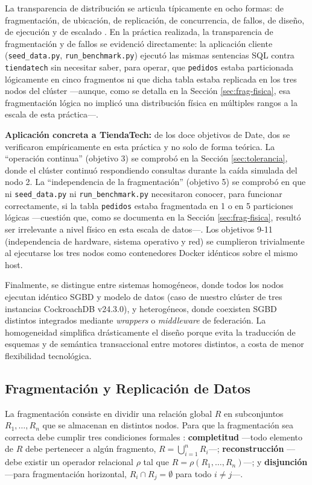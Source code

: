 \documentclass[10pt,letterpaper]{article}
\begin{document}
La transparencia de distribución se articula típicamente en ocho formas: de fragmentación, de ubicación, de replicación, de concurrencia, de fallos, de diseño, de ejecución y de escalado \citep{ozsu2020}. En la práctica realizada, la transparencia de fragmentación y de fallos se evidenció directamente: la aplicación cliente (\texttt{seed\_data.py}, \texttt{run\_benchmark.py}) ejecutó las mismas sentencias SQL contra \texttt{tiendatech} sin necesitar saber, para operar, que \texttt{pedidos} estaba particionada lógicamente en cinco fragmentos ni que dicha tabla estaba replicada en los tres nodos del clúster —aunque, como se detalla en la Sección \ref{sec:frag-fisica}, esa fragmentación lógica no implicó una distribución física en múltiples rangos a la escala de esta práctica—.

\textbf{Aplicación concreta a TiendaTech:} de los doce objetivos de Date, dos se verificaron empíricamente en esta práctica y no solo de forma teórica. La ``operación continua'' (objetivo 3) se comprobó en la Sección \ref{sec:tolerancia}, donde el clúster continuó respondiendo consultas durante la caída simulada del nodo 2. La ``independencia de la fragmentación'' (objetivo 5) se comprobó en que ni \texttt{seed\_data.py} ni \texttt{run\_benchmark.py} necesitaron conocer, para funcionar correctamente, si la tabla \texttt{pedidos} estaba fragmentada en 1 o en 5 particiones lógicas —cuestión que, como se documenta en la Sección \ref{sec:frag-fisica}, resultó ser irrelevante a nivel físico en esta escala de datos—. Los objetivos 9-11 (independencia de hardware, sistema operativo y red) se cumplieron trivialmente al ejecutarse los tres nodos como contenedores Docker idénticos sobre el mismo host.

Finalmente, se distingue entre sistemas homogéneos, donde todos los nodos ejecutan idéntico SGBD y modelo de datos (caso de nuestro clúster de tres instancias CockroachDB v24.3.0), y heterogéneos, donde coexisten SGBD distintos integrados mediante \textit{wrappers} o \textit{middleware} de federación. La homogeneidad simplifica drásticamente el diseño porque evita la traducción de esquemas y de semántica transaccional entre motores distintos, a costa de menor flexibilidad tecnológica.

\subsection{Fragmentación y Replicación de Datos}
\label{sec:fragmentacion}

La fragmentación consiste en dividir una relación global $R$ en subconjuntos $R_1,\dots,R_n$ que se almacenan en distintos nodos. Para que la fragmentación sea correcta debe cumplir tres condiciones formales \citep{ozsu2020}: \textbf{completitud} —todo elemento de $R$ debe pertenecer a algún fragmento, $R = \bigcup_{i=1}^{n} R_i$—; \textbf{reconstrucción} —debe existir un operador relacional $\rho$ tal que $R = \rho(R_1,\dots,R_n)$—; y \textbf{disjunción} —para fragmentación horizontal, $R_i \cap R_j = \emptyset$ para todo $i \neq j$—.
\end{document}
